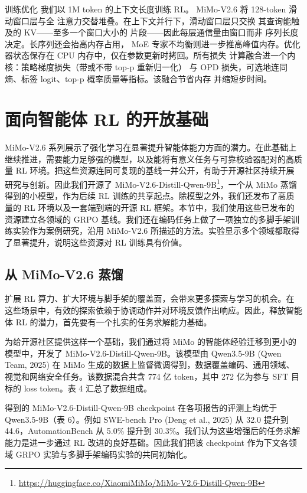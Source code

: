 \documentclass[
  10
]{article}
\begin{document}
训练优化 我们以 1M token 的上下文长度训练 RL。
MiMo-V2.6 将 128-token 滑动窗口层与全
注意力交替堆叠。在上下文并行下，滑动窗口层只交换
其查询能触及的 KV——至多一个窗口大小的
片段——因此每层通信量由窗口而非
序列长度决定。长序列还会抬高内存占用，
MoE 专家不均衡则进一步推高峰值内存。优化器状态保存在
CPU 内存中，仅在参数更新时拷回。所有损失
计算融合进一个内核：策略梯度损失（带或不带 top-p 重新归一化）
与 OPD 损失，可选地连同熵、标签 logit、top-p 概率质量等指标。该融合节省内存
并缩短步时间。

\section{面向智能体 RL 的开放基础}\label{open-foundations-for-agentic-rl}

MiMo-V2.6 系列展示了强化学习在显著提升智能体能力方面的潜力。在此基础上继续推进，需要能力足够强的模型，以及能将有意义任务与可靠校验器配对的高质量 RL 环境。把这些资源连同可复现的基线一并公开，有助于开源社区持续开展研究与创新。因此我们开源了 MiMo-V2.6-Distill-Qwen-9B\footnote{\url{https://huggingface.co/XiaomiMiMo/MiMo-V2.6-Distill-Qwen-9B}}，一个从 MiMo 蒸馏得到的小模型，作为后续 RL 训练的共享起点。除模型之外，我们还发布了高质量的 RL 环境以及一套端到端的开源 RL 框架。本节中，我们使用这些已发布的资源建立各领域的 GRPO 基线。我们还在编码任务上做了一项独立的多脚手架训练实验作为案例研究，沿用 MiMo-V2.6 所描述的方法。实验显示多个领域都取得了显著提升，说明这些资源对 RL 训练具有价值。

\subsection{从 MiMo-V2.6 蒸馏}\label{distillation-from-mimo-v2.6}

扩展 RL 算力、扩大环境与脚手架的覆盖面，会带来更多探索与学习的机会。在这些场景中，有效的探索依赖于协调动作并对环境反馈作出响应。因此，释放智能体 RL 的潜力，首先要有一个扎实的任务求解能力基础。

为给开源社区提供这样一个基础，我们通过将 MiMo 的智能体经验迁移到更小的模型中，开发了 MiMo-V2.6-Distill-Qwen-9B。该模型由 Qwen3.5-9B (Qwen Team, 2025) 在 MiMo 生成的数据上监督微调得到，数据覆盖编码、通用领域、视觉和网络安全任务。该数据混合共含 774 亿 token，其中 272 亿为参与 SFT 目标的 loss token。表 4 汇总了数据组成。

得到的 MiMo-V2.6-Distill-Qwen-9B checkpoint 在各项报告的评测上均优于 Qwen3.5-9B（表 6）。例如 SWE-bench Pro (Deng et al., 2025) 从 32.0 提升到 44.6，AutomationBench 从 5.0\% 提升到 30.3\%。我们认为这些增强后的任务求解能力是进一步通过 RL 改进的良好基础。因此我们把该 checkpoint 作为下文各领域 GRPO 实验与多脚手架编码实验的共同初始化。
\end{document}
